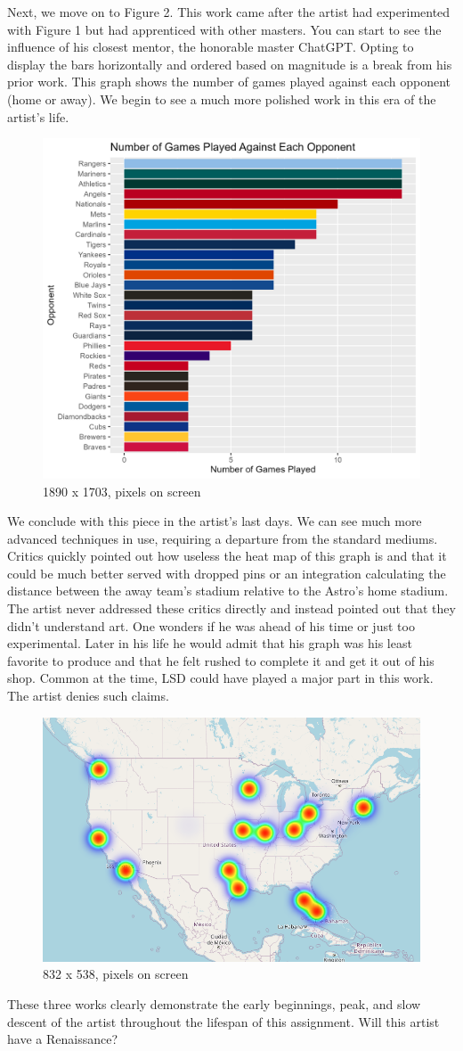 \documentclass{article}
\begin{document}
Next, we move on to Figure 2. This work came after the artist had experimented with Figure 1 but had apprenticed with other masters. You can start to see the influence of his closest mentor, the honorable master ChatGPT. Opting to display the bars horizontally and ordered based on magnitude is a break from his prior work. This graph shows the number of games played against each opponent (home or away). We begin to see a much more polished work in this era of the artist's life.
\begin{figure}
    \centering
    \includegraphics[width=0.5\linewidth]{PS6b_Zilles.png}
    \caption{1890 x 1703, pixels on screen}
    \label{fig:enter-label}
\end{figure}

We conclude with this piece in the artist's last days. We can see much more advanced techniques in use, requiring a departure from the standard mediums. Critics quickly pointed out how useless the heat map of this graph is and that it could be much better served with dropped pins or an integration calculating the distance between the away team's stadium relative to the Astro's home stadium. The artist never addressed these critics directly and instead pointed out that they didn't understand art. One wonders if he was ahead of his time or just too experimental. Later in his life he would admit that his graph was his least favorite to produce and that he felt rushed to complete it and get it out of his shop. Common at the time, LSD could have played a major part in this work. The artist denies such claims.
\begin{figure}
    \centering
    \includegraphics[width=0.5\linewidth]{PS6c_Zilles.png}
    \caption{832 x 538, pixels on screen}
    \label{fig:enter-label}
\end{figure}

These three works clearly demonstrate the early beginnings, peak, and slow descent of the artist throughout the lifespan of this assignment. Will this artist have a Renaissance?
\end{document}
